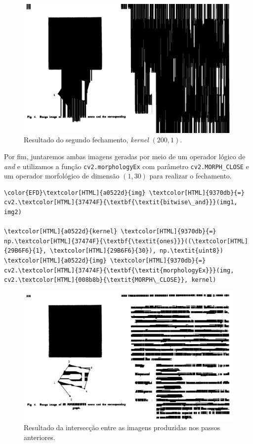 \documentclass[twocolumn, 10pt]{article}
\begin{document}
\begin{figure}[htbp]
\centering
\includegraphics[width=.9\linewidth]{./img/step4.png}
\caption{Resultado do segundo fechamento, \emph{kernel} \((200,1)\).}
\end{figure}

Por fim, juntaremos ambas imagens geradas por meio de um operador lógico de \emph{and} e utilizamos a função \texttt{cv2.morphologyEx} com parâmetro \texttt{cv2.MORPH\_CLOSE} e um operador morfológico de dimensão \((1,30)\) para realizar o fechamento.
\begin{Code}
\begin{Verbatim}
\color{EFD}\textcolor[HTML]{a0522d}{img} \textcolor[HTML]{9370db}{=} cv2.\textcolor[HTML]{37474F}{\textbf{\textit{bitwise\_and}}}(img1, img2)

\textcolor[HTML]{a0522d}{kernel} \textcolor[HTML]{9370db}{=} np.\textcolor[HTML]{37474F}{\textbf{\textit{ones}}}((\textcolor[HTML]{29B6F6}{1}, \textcolor[HTML]{29B6F6}{30}), np.\textit{uint8})
\textcolor[HTML]{a0522d}{img} \textcolor[HTML]{9370db}{=} cv2.\textcolor[HTML]{37474F}{\textbf{\textit{morphologyEx}}}(img, cv2.\textcolor[HTML]{008b8b}{\textit{MORPH\_CLOSE}}, kernel)
\end{Verbatim}
\end{Code}

\begin{figure}[htbp]
\centering
\includegraphics[width=.9\linewidth]{./img/step5.png}
\caption{Resultado da intersecção entre as imagens produzidas nos passos anteriores.}
\end{figure}
\end{document}
